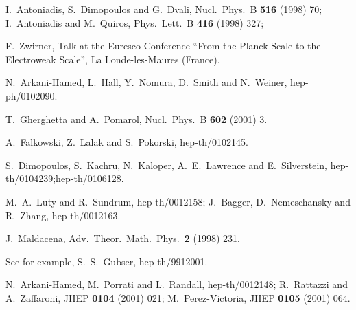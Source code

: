 \documentclass[a4paper,12pt]{article}
\begin{document}
\begin{thebibliography}{99}
I.~Antoniadis, S.~Dimopoulos and G.~Dvali,
Nucl.\ Phys.\ B {\bf 516} (1998) 70;
I.~Antoniadis and M.~Quiros,
Phys.\ Lett.\ B {\bf 416} (1998) 327;



F.~Zwirner, Talk at the
Euresco Conference ``From the Planck Scale to the Electroweak Scale'',
La Londe-les-Maures (France).


N.~Arkani-Hamed, L.~Hall, Y.~Nomura, D.~Smith and N.~Weiner,
hep-ph/0102090.







T.~Gherghetta and A.~Pomarol,
Nucl.\ Phys.\ B {\bf 602} (2001) 3.


A.~Falkowski, Z.~Lalak and S.~Pokorski,
hep-th/0102145.



S.~Dimopoulos, S.~Kachru, N.~Kaloper, A.~E.~Lawrence and E.~Silverstein,
hep-th/0104239;hep-th/0106128.







M.~A.~Luty and R.~Sundrum,
hep-th/0012158;
J.~Bagger, D.~Nemeschansky and R.~Zhang,
hep-th/0012163.




J.~Maldacena,
Adv.\ Theor.\ Math.\ Phys.\ {\bf 2} (1998) 231.


See for example, S.~S.~Gubser,
hep-th/9912001.


N.~Arkani-Hamed, M.~Porrati and L.~Randall,
hep-th/0012148;
R.~Rattazzi and A.~Zaffaroni,
JHEP {\bf 0104} (2001) 021;
M.~Perez-Victoria,
JHEP {\bf 0105} (2001) 064.






\end{thebibliography}
\end{document}
